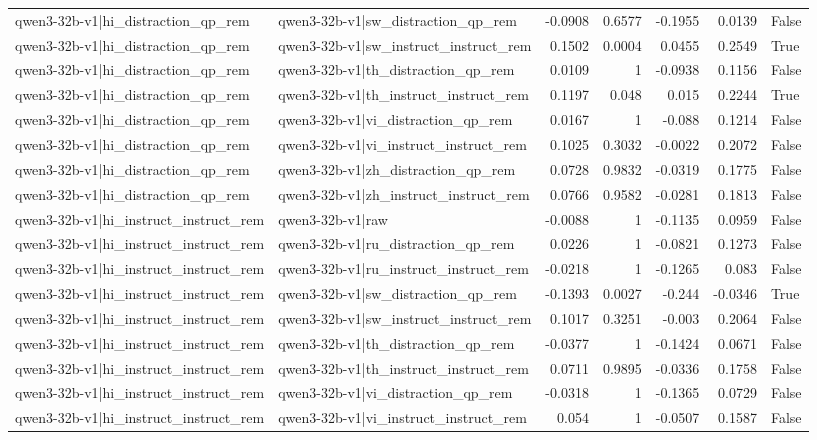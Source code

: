 \begin{table}
\begin{tabular}{l l r r r r l}
qwen3-32b-v1|hi_distraction_qp_rem & qwen3-32b-v1|sw_distraction_qp_rem & -0.0908 & 0.6577 & -0.1955 & 0.0139 & False \\
qwen3-32b-v1|hi_distraction_qp_rem & qwen3-32b-v1|sw_instruct_instruct_rem & 0.1502 & 0.0004 & 0.0455 & 0.2549 & True \\
qwen3-32b-v1|hi_distraction_qp_rem & qwen3-32b-v1|th_distraction_qp_rem & 0.0109 & 1 & -0.0938 & 0.1156 & False \\
qwen3-32b-v1|hi_distraction_qp_rem & qwen3-32b-v1|th_instruct_instruct_rem & 0.1197 & 0.048 & 0.015 & 0.2244 & True \\
qwen3-32b-v1|hi_distraction_qp_rem & qwen3-32b-v1|vi_distraction_qp_rem & 0.0167 & 1 & -0.088 & 0.1214 & False \\
qwen3-32b-v1|hi_distraction_qp_rem & qwen3-32b-v1|vi_instruct_instruct_rem & 0.1025 & 0.3032 & -0.0022 & 0.2072 & False \\
qwen3-32b-v1|hi_distraction_qp_rem & qwen3-32b-v1|zh_distraction_qp_rem & 0.0728 & 0.9832 & -0.0319 & 0.1775 & False \\
qwen3-32b-v1|hi_distraction_qp_rem & qwen3-32b-v1|zh_instruct_instruct_rem & 0.0766 & 0.9582 & -0.0281 & 0.1813 & False \\
qwen3-32b-v1|hi_instruct_instruct_rem & qwen3-32b-v1|raw & -0.0088 & 1 & -0.1135 & 0.0959 & False \\
qwen3-32b-v1|hi_instruct_instruct_rem & qwen3-32b-v1|ru_distraction_qp_rem & 0.0226 & 1 & -0.0821 & 0.1273 & False \\
qwen3-32b-v1|hi_instruct_instruct_rem & qwen3-32b-v1|ru_instruct_instruct_rem & -0.0218 & 1 & -0.1265 & 0.083 & False \\
qwen3-32b-v1|hi_instruct_instruct_rem & qwen3-32b-v1|sw_distraction_qp_rem & -0.1393 & 0.0027 & -0.244 & -0.0346 & True \\
qwen3-32b-v1|hi_instruct_instruct_rem & qwen3-32b-v1|sw_instruct_instruct_rem & 0.1017 & 0.3251 & -0.003 & 0.2064 & False \\
qwen3-32b-v1|hi_instruct_instruct_rem & qwen3-32b-v1|th_distraction_qp_rem & -0.0377 & 1 & -0.1424 & 0.0671 & False \\
qwen3-32b-v1|hi_instruct_instruct_rem & qwen3-32b-v1|th_instruct_instruct_rem & 0.0711 & 0.9895 & -0.0336 & 0.1758 & False \\
qwen3-32b-v1|hi_instruct_instruct_rem & qwen3-32b-v1|vi_distraction_qp_rem & -0.0318 & 1 & -0.1365 & 0.0729 & False \\
qwen3-32b-v1|hi_instruct_instruct_rem & qwen3-32b-v1|vi_instruct_instruct_rem & 0.054 & 1 & -0.0507 & 0.1587 & False \\

\end{tabular}
\end{table}
